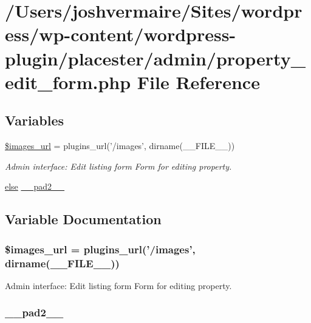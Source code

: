 \hypertarget{property__edit__form_8php}{
\section{/Users/joshvermaire/Sites/wordpress/wp-\/content/wordpress-\/plugin/placester/admin/property\_\-edit\_\-form.php File Reference}
\label{d3/d0b/property__edit__form_8php}
}
\subsection*{Variables}
\begin{DoxyCompactItemize}
\item 
\hyperlink{property__edit__form_8php_a7c7a58fcbd50e3aaa4493121ecf59e25}{\$images\_\-url} = plugins\_\-url('/images', dirname(\_\-\_\-FILE\_\-\_\-))
\begin{DoxyCompactList}\small\item\em Admin interface: Edit listing form Form for editing property. \end{DoxyCompactList}\item 
\hyperlink{listings__list__of__map_8php_a0544c3fe466e421738dae463968b70ba}{else} \hyperlink{property__edit__form_8php_aed2d37b4e8da3f52103ae96ce9d26d82}{\_\-\_\-pad2\_\-\_\-}
\end{DoxyCompactItemize}


\subsection{Variable Documentation}
\hypertarget{property__edit__form_8php_a7c7a58fcbd50e3aaa4493121ecf59e25}{
\subsubsection[{\$images\_\-url}]{\setlength{\rightskip}{0pt plus 5cm}\$images\_\-url = plugins\_\-url('/images', dirname(\_\-\_\-FILE\_\-\_\-))}}
\label{d3/d0b/property__edit__form_8php_a7c7a58fcbd50e3aaa4493121ecf59e25}


Admin interface: Edit listing form Form for editing property. 

\hypertarget{property__edit__form_8php_aed2d37b4e8da3f52103ae96ce9d26d82}{
\subsubsection[{\_\-\_\-pad2\_\-\_\-}]{ {\bf \_\-\_\-pad2\_\-\_\-}}}
\label{d3/d0b/property__edit__form_8php_aed2d37b4e8da3f52103ae96ce9d26d82}
